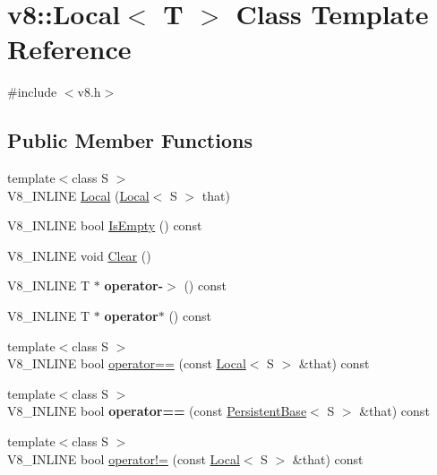 \hypertarget{classv8_1_1Local}{}\section{v8\+:\+:Local$<$ T $>$ Class Template Reference}
\label{classv8_1_1Local}


{\ttfamily \#include $<$v8.\+h$>$}

\subsection*{Public Member Functions}
\begin{DoxyCompactItemize}
\item 
{\footnotesize template$<$class S $>$ }\\V8\+\_\+\+I\+N\+L\+I\+NE \mbox{\hyperlink{classv8_1_1Local_a18d761713c1062a38f58a568fffe8f80}{Local}} (\mbox{\hyperlink{classv8_1_1Local}{Local}}$<$ S $>$ that)
\item 
V8\+\_\+\+I\+N\+L\+I\+NE bool \mbox{\hyperlink{classv8_1_1Local_aeec81dfca98e0d5b2f26ae13c2d141f4}{Is\+Empty}} () const
\item 
V8\+\_\+\+I\+N\+L\+I\+NE void \mbox{\hyperlink{classv8_1_1Local_a6fcf63af6bdd697ddd7c3acd16c69899}{Clear}} ()
\item 
\mbox{\label{classv8_1_1Local_a623075fb5b2f5d11d5d1605d97caf9a7}} 
V8\+\_\+\+I\+N\+L\+I\+NE T $\ast$ {\bfseries operator-\/$>$} () const
\item 
\mbox{\label{classv8_1_1Local_a3c96c0bc5db1288bad5769e8e54e26da}} 
V8\+\_\+\+I\+N\+L\+I\+NE T $\ast$ {\bfseries operator$\ast$} () const
\item 
{\footnotesize template$<$class S $>$ }\\V8\+\_\+\+I\+N\+L\+I\+NE bool \mbox{\hyperlink{classv8_1_1Local_a0dfaa25015487674f568a4e1cd0be48c}{operator==}} (const \mbox{\hyperlink{classv8_1_1Local}{Local}}$<$ S $>$ \&that) const
\item 
\mbox{\label{classv8_1_1Local_adb40332ce6a33ae498af05809c0a2389}} 
{\footnotesize template$<$class S $>$ }\\V8\+\_\+\+I\+N\+L\+I\+NE bool {\bfseries operator==} (const \mbox{\hyperlink{classv8_1_1PersistentBase}{Persistent\+Base}}$<$ S $>$ \&that) const
\item 
{\footnotesize template$<$class S $>$ }\\V8\+\_\+\+I\+N\+L\+I\+NE bool \mbox{\hyperlink{classv8_1_1Local_a3b2ae1c0415d319099ebc2fd059dbb10}{operator!=}} (const \mbox{\hyperlink{classv8_1_1Local}{Local}}$<$ S $>$ \&that) const

\end{DoxyCompactItemize}

